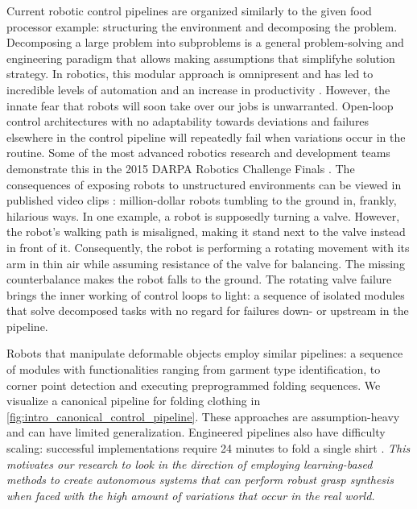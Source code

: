 \documentclass[\home/main.tex]{subfiles}
\begin{document}
Current robotic control pipelines are organized similarly to the given food processor example: structuring the environment and decomposing the problem. Decomposing a large problem into subproblems is a general problem-solving and engineering paradigm that allows making assumptions that simplifyhe solution strategy. In robotics, this modular approach is omnipresent and has led to incredible levels of automation and an increase in productivity \autocite{Graetz2018}. However, the innate fear that robots will soon take over our jobs \autocite{cave2019hopes} is unwarranted.
Open-loop control architectures with no adaptability towards deviations and failures elsewhere in the control pipeline will repeatedly fail when variations occur in the routine. Some of the most advanced robotics research and development teams demonstrate this in the 2015 DARPA Robotics Challenge Finals \autocite{DARPA2015}. The consequences of exposing robots to unstructured environments can be viewed in published video clips \autocite{darpaVideos}: million-dollar robots tumbling to the ground in, frankly, hilarious ways. In one example, a robot is supposedly turning a valve. However, the robot's walking path is misaligned, making it stand next to the valve instead in front of it. Consequently, the robot is performing a rotating movement with its arm in thin air while assuming resistance of the valve for balancing. The missing counterbalance makes the robot falls to the ground. The rotating valve failure brings the inner working of control loops to light: a sequence of isolated modules that solve decomposed tasks with no regard for failures down- or upstream in the pipeline.

Robots that manipulate deformable objects employ similar pipelines: a sequence of modules with functionalities ranging from garment type identification, to corner point detection and executing preprogrammed folding sequences. We visualize a canonical pipeline for folding clothing in \cref{fig:intro_canonical_control_pipeline}. These approaches are assumption-heavy and can have limited generalization. Engineered pipelines also have difficulty scaling: successful implementations require 24 minutes to fold a single shirt \autocite{Maitin2010}. \emph{This motivates our research to look in the direction of employing learning-based methods to create autonomous systems that can perform robust grasp synthesis when faced with the high amount of variations that occur in the real world.}
\end{document}
